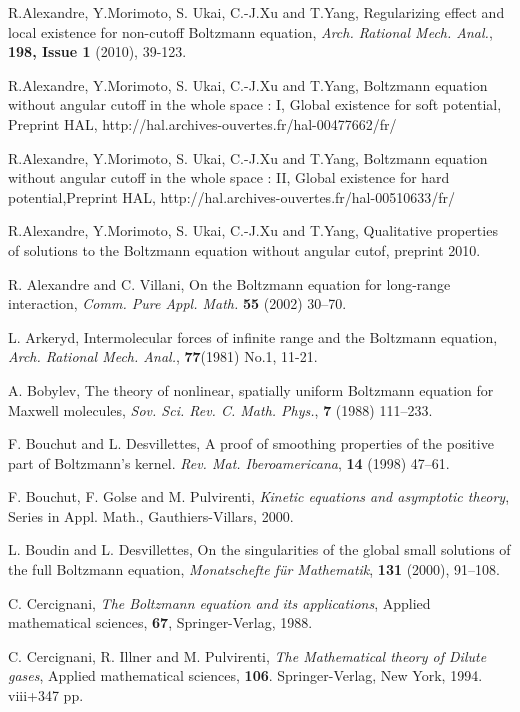 \documentclass{amsart}[12pt, article]
\begin{document}
\begin{thebibliography}{99}
 R.Alexandre, Y.Morimoto, S. Ukai, C.-J.Xu
and T.Yang, Regularizing effect and local existence
for non-cutoff Boltzmann equation, {\it Arch. Rational Mech. Anal.},
{\bf  198, Issue 1 }(2010), 39-123. 

 R.Alexandre, Y.Morimoto, S. Ukai, C.-J.Xu
and T.Yang, Boltzmann equation without angular cutoff in the whole
space : I, Global existence for soft
potential, Preprint HAL,
http://hal.archives-ouvertes.fr/hal-00477662/fr/

 R.Alexandre, Y.Morimoto, S. Ukai, C.-J.Xu
and T.Yang, Boltzmann equation without angular cutoff in the whole
space : II, Global existence for hard potential,Preprint HAL,
http://hal.archives-ouvertes.fr/hal-00510633/fr/

 R.Alexandre, Y.Morimoto, S. Ukai, C.-J.Xu
and T.Yang, Qualitative properties of solutions to the Boltzmann equation without angular cutof,
preprint 2010.

R. Alexandre and  C. Villani, On the Boltzmann equation for
long-range interaction, {\it Comm. Pure  Appl.
Math.} {\bf 55} (2002) 30--70.

L. Arkeryd, Intermolecular forces of infinite range and the Boltzmann equation,
{\it Arch. Rational Mech. Anal.}, {\bf 77}(1981) No.1, 11-21.

A. Bobylev, The theory of nonlinear, spatially uniform Boltzmann
equation for Maxwell molecules, {\it Sov. Sci. Rev. C. Math.
Phys.}, {\bf 7} (1988) 111--233.

F. Bouchut and L. Desvillettes, A proof of smoothing properties of
the positive part of Boltzmann's kernel. {\it Rev. Mat. Iberoamericana},
{\bf 14} (1998) 47--61.

 F. Bouchut, F. Golse and M. Pulvirenti,
{\it Kinetic equations and asymptotic theory}, Series in Appl. Math.,
Gauthiers-Villars, 2000.

L. Boudin and L. Desvillettes, On the singularities of the global small
solutions of the full Boltzmann equation, {\it Monatschefte f\"{u}r
Mathematik}, {\bf 131} (2000), 91--108.

 \rm C. Cercignani, {\it The Boltzmann equation and its applications},
Applied mathematical sciences, {\bf 67}, Springer-Verlag, 1988.

C. Cercignani, R. Illner and  M. Pulvirenti, {\it The Mathematical
theory of Dilute gases}, Applied mathematical sciences, {\bf 106}.
Springer-Verlag, New York, 1994. viii+347 pp.


\end{thebibliography}
\end{document}
